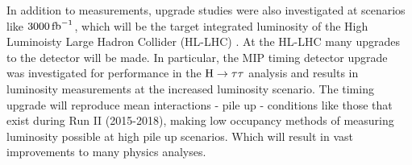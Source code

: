 In addition to measurements,  upgrade studies were also investigated at scenarios like $3000 \mbox{\ensuremath{\,\text{fb}^\text{$-$1}}}$, which will be the target integrated luminosity of the High Luminoisty Large Hadron Collider (HL-LHC) . At the HL-LHC many upgrades to the detector will be made. In particular, the MIP timing detector upgrade ~\cite{MIP} was investigated for performance in the $\mathrm{H} \to \tau\tau$ analysis and results in luminosity measurements at the increased luminosity scenario. The timing upgrade will reproduce mean interactions - pile up - conditions like those that exist during Run II (2015-2018), making low occupancy methods of measuring luminosity possible at high pile up scenarios. Which will result in vast improvements to many physics analyses. 





